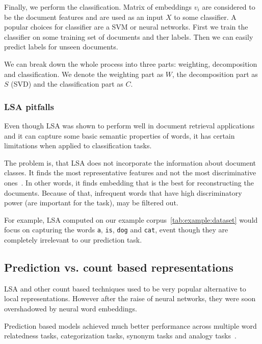     Finally, we perform the classification.
    Matrix of embeddings $v_i$ are considered to be the document features and are used as an input $X$ to some classifier. 
    A popular choices for classifier are a SVM or neural networks.
    First we train the classifier on some training set of documents and ther labels.
    Then we can easily predict labels for unseen documents.
    
    We can break down the whole process into three parts: weighting, decomposition and classification.
    We denote the weighting part as $W$, the decomposition part as $S$ (SVD) and the classification part as $C$.
    
    \subsubsection{LSA pitfalls}

    Even though LSA was shown to perform well in document retrieval applications and it can capture some basic semantic properties of words,
    it has certain limitations when applied to classification tasks. 
    
    The problem is, that LSA does not incorporate the information about document classes. 
    It finds the most representative features and not the most discriminative ones~\cite{berry1995using}.
    In other words, it finds embedding that is the best for reconstructing the documents.
    Because of that, infrequent words that have high discriminatory power (are important for the task), may be filtered out.
    
    For example, LSA computed on our example corpus~\ref{tab:example:dataset} would focus on capturing the words \texttt{a}, \texttt{is}, \texttt{dog} and \texttt{cat},
    event though they are completely irrelevant to our prediction task.
    
    \subsection{Prediction vs. count based representations} \label{sec:count:vs:predict}
        
    LSA and other count based techniques used to be very popular alternative to local representations.
    However after the raise of neural networks, they were soon overshadowed by neural word embeddings.
    
    Prediction based models achieved much better performance across multiple word relatedness tasks, categorization tasks, synonym tasks and analogy tasks~\cite{baroni2014don}. %
    
